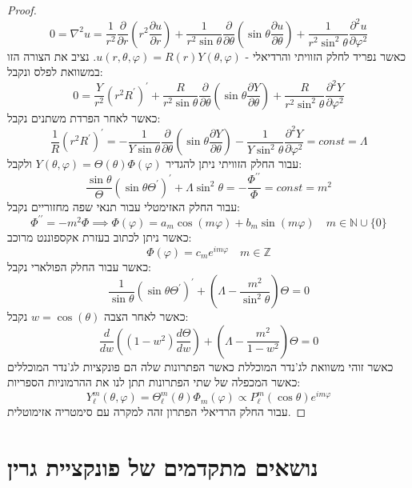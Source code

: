 \documentclass{tstextbook}
\begin{document}
\begin{proof}
$$0=\nabla^{2}u={\frac{1}{r^{2}}}{\frac{\partial}{\partial r}}\left(r^{2}{\frac{\partial u}{\partial r}}\right)+{\frac{1}{r^{2}\sin\theta}}{\frac{\partial}{\partial\theta}}\left(\sin\theta{\frac{\partial u}{\partial\theta}}\right)+{\frac{1}{r^{2}\sin^{2}\theta}}{\frac{\partial^{2}u}{\partial\varphi^{2}}}$$
כאשר נפריד לחלק הזוויתי והרדיאלי - \(u\left( r,\theta,\varphi \right)=R(r)Y\left( \theta,\varphi \right)\). נציב את הצורה הזו במשוואת לפלס ונקבל:
$$0=\frac{Y}{r^{2}}\left(r^{2}R^{\prime}\right)^{\prime}+\frac{R}{r^{2}\sin\theta}\frac{\partial}{\partial\theta}\left(\sin\theta\frac{\partial Y}{\partial\theta}\right)+\frac{R}{r^{2}\sin^{2}\theta}\frac{\partial^{2}Y}{\partial\varphi^{2}}$$
כאשר לאחר הפרדת משתנים נקבל:
$${\frac{1}{R}}\left(r^{2}R^{\prime}\right)^{\prime}=-{\frac{1}{Y\sin\theta}}{\frac{\partial}{\partial\theta}}\left(\sin\theta{\frac{\partial Y}{\partial\theta}}\right)-{\frac{1}{Y\sin^{2}\theta}}{\frac{\partial^{2}Y}{\partial\varphi^{2}}}=c o n s t=\Lambda$$
עבור החלק הזוויתי ניתן להגדיר \(Y\left( \theta,\varphi \right)=\Theta\left( \theta \right)\Phi\left( \varphi \right)\) ולקבל:
$$\frac{\sin\theta}{\Theta}\left(\sin\theta\Theta^{\prime}\right)^{\prime}+\Lambda\sin^{2}\theta=-\frac{\Phi^{\prime\prime}}{\Phi}=c o n s t=m^{2}$$
עבור החלק האזימטלי עבור תנאי שפה מחזוריים נקבל:
$$\Phi^{\prime\prime}=-m^{2}\Phi\implies \Phi\left( \varphi \right)=a_{m}\cos\left( m\varphi \right)+b_{m}\sin\left( m\varphi \right) \quad  m \in \mathbb{N}\cup \{ 0 \}$$
כאשר ניתן לכתוב בעזרת אקספוננט מרוכב:
$$\Phi\left( \varphi \right)=c_{m}e^{i m\varphi}\quad m \in \mathbb{Z}$$
כאשר עבור החלק הפולארי נקבל:
$$\frac{1}{\sin\theta}\left(\sin\theta\Theta^{\prime}\right)^{\prime}+\left(\Lambda-\frac{m^{2}}{\sin^{2}\theta}\right)\Theta=0$$
כאשר לאחר הצבה \(w=\cos\left( \theta \right)\) נקבל:
$$\frac{d}{d w}\left((1-w^{2})\frac{d\Theta}{d w}\right)+\left(\Lambda-\frac{m^{2}}{1-w^{2}}\right)\Theta=0$$
כאשר זוהי משוואת לג'נדר המוכללת כאשר הפתרונות שלה הם פונקציות לג'נדר המוכללים כאשר המכפלה של שתי הפתרונות תתן לנו את ההרמוניות הספריות:
$$Y_{\ell}^{m}(\theta,\varphi)=\Theta_{\ell}^{m}(\theta)\Phi_{m}(\varphi)\propto P_{\ell}^{m}(\cos\theta)e^{i m\varphi}$$
עבור החלק הרדיאלי הפתרון זהה למקרה עם סימטריה אזימוטלית.

\end{proof}
\chapter{נושאים מתקדמים של פונקציית גרין}
\end{document}
